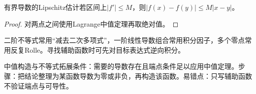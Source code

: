 \begin{lemma}{有界导数的Lipschitz估计}若区间上$|f\prime|\le M$，则$|f(x)-f(y)|\le M|x-y|$。\end{lemma}
\begin{proof}对两点之间使用Lagrange中值定理再取绝对值。\end{proof}
\begin{extension}二阶不等式常用“减去二次多项式”，一阶线性导数组合常用积分因子，多个零点常用反复Rolle。寻找辅助函数时可先对目标表达式逆向积分。\end{extension}

\begin{method}{中值构造与不等式拓展}条件：需要的导数存在且端点条件足以应用中值定理。步骤：把结论整理为某函数导数为零或非负，再构造该函数。易错点：只写辅助函数不验证端点与可导性。\end{method}
